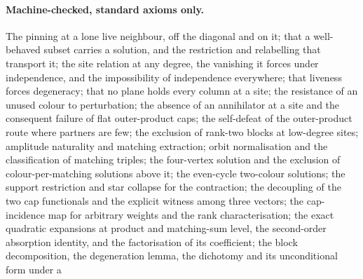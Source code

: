 \documentclass[11pt]{article}
\theoremstyle{definition}
\theoremstyle{remark}
\begin{document}
\paragraph{Machine-checked, standard axioms only.} The pinning at a lone live neighbour,
off the diagonal and on it; that a well-behaved subset carries a solution, and the
restriction and relabelling that transport it; the site relation at any degree, the
vanishing it forces under independence, and the impossibility of independence everywhere;
that liveness forces degeneracy; that no plane holds every column at a site; the
resistance of an unused colour to
perturbation; the absence of an annihilator at a
site and the consequent failure of flat outer-product caps; the self-defeat of the
outer-product route where partners are few; the exclusion of rank-two blocks at low-degree
sites; amplitude naturality and matching
extraction; orbit normalisation and the classification of matching triples; the
four-vertex solution and the exclusion of colour-per-matching solutions above it; the
even-cycle two-colour solutions; the support restriction and star collapse for the
contraction; the decoupling of the two cap functionals and the explicit witness among
three vectors; the cap-incidence map for arbitrary weights and the rank
characterisation; the exact quadratic expansions at product and matching-sum level, the
second-order absorption identity, and the factorisation of its coefficient; the block
decomposition, the degeneration lemma, the dichotomy and its unconditional form under a
\end{document}
